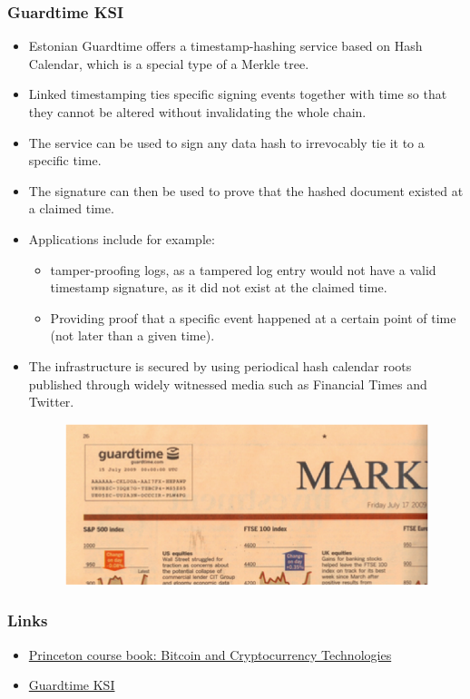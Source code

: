 \documentclass[8pt]{beamer}
\begin{document}
\begin{frame}
\frametitle{Guardtime KSI}
\begin{itemize}
 \item Estonian Guardtime offers a timestamp-hashing service based on Hash Calendar, which is a special type of a Merkle tree.
 \item Linked timestamping ties specific signing events together with time so that they cannot be altered without invalidating the whole chain.
 \item The service can be used to sign any data hash to irrevocably tie it to a specific time.
 \item The signature can then be used to prove that the hashed document existed at a claimed time.
 \item Applications include for example:
 \begin{itemize}
   \item tamper-proofing logs, as a tampered log entry would not have a valid timestamp signature, as it did not exist at the claimed time.
   \item Providing proof that a specific event happened at a certain point of time (not later than a given time).
 \end{itemize}
 \item The infrastructure is secured by using periodical hash calendar roots published through widely witnessed media such as Financial Times and Twitter.
\begin{figure}[tb]
 \centering
 \includegraphics[width=3 cm,keepaspectratio=true]{./blockchain_images/widely_witnessed_media.png}
\end{figure}
\end{itemize}

\end{frame}

\begin{frame}
\frametitle{Links}
\begin{itemize}
 \item \href{https://d28rh4a8wq0iu5.cloudfront.net/bitcointech/readings/princeton\_bitcoin\_book.pdf?a=1}{Princeton course book: Bitcoin and Cryptocurrency Technologies}
 \item \href{https://guardtime.com/technology/ksi-technology}{Guardtime KSI}
\end{itemize}
\end{frame}
\end{document}
